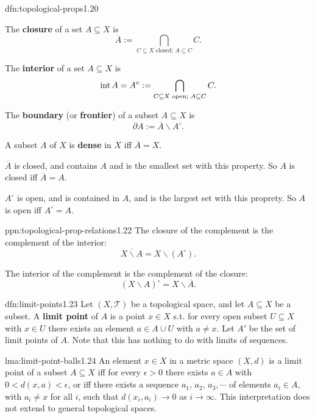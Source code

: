 \documentclass[landscape, 8pt]{extarticle}
\begin{document}
\begin{multicols}{3}
\begin{dfn}{dfn:topological-props}{1.20}
\begin{enumerate-tight}
\item The \textbf{closure} of a set $A \subseteq X$ is
\[\overline{A} := \bigcap_{C \subseteq X \text{ closed; }A \subseteq C} C.\]
\item The \textbf{interior} of a set $A \subseteq X$ is
\[\operatorname{int} A = A^{\circ} := \bigcap_{C \subseteq X \text{ open; }A \subseteq C} C.\]
\item The \textbf{boundary} (or \textbf{frontier}) of a subset $A \subseteq X$ is
\[\partial A := \overline{A} \backslash A^{\circ}.\]
\item A subset $A$ of $X$ is \textbf{dense} in $X$ iff $\overline{A} = X$.
\end{enumerate-tight}
$\overline{A}$ is closed, and contains $A$ and is the smallest set with this property. So $A$ is closed iff $\overline{A} = A$.

$A^{\circ}$ is open, and is contained in $A$, and is the largest set with this proprety. So $A$ is open iff $A^{\circ} = A$.

\end{dfn}

\begin{ppn}{ppn:topological-prop-relations}{1.22}
	The closure of the complement is the complement of the interior:
	\[\overline{X \backslash A} = X \backslash (A^{\circ}).\]

	The interior of the complement is the complement of the closure:
	\[(X \backslash A)^{\circ} = X \backslash \overline{A}.\]
\end{ppn}

\begin{dfn}{dfn:limit-points}{1.23}
	Let $(X, \mathcal{T})$ be a topological space, and let $A \subseteq X$ be a subset. A \textbf{limit point} of $A$ is a point $x\in X$ s.t. for every open subset $U \subseteq X$ with $x\in U$ there exists an element $a\in A \cup U$ with $a \ne x$. Let $A'$ be the set of limit points of $A$.\newline
	Note that this has nothing to do with limits of sequences.
\end{dfn}

\newpage
\begin{lma}{lma:limit-point-balls}{1.24}
	An element $x\in X$ in a metric space $(X, d)$ is a limit point of a subset $A \subseteq X$ iff for every $\epsilon > 0$ there exists $a\in A$ with $0<d(x,a)<\epsilon$, or iff there exists a sequence $a_{1},\,a_{2},\,a_{3},\cdots$ of elements $a_{i}\in A$, with $a_{i}  \ne x$ for all $i$, such that $d(x_{i}, a_{i}) \to 0$ as $i \to\infty$. This interpretation does not extend to general topological spaces.
\end{lma}


\end{multicols}
\end{document}
